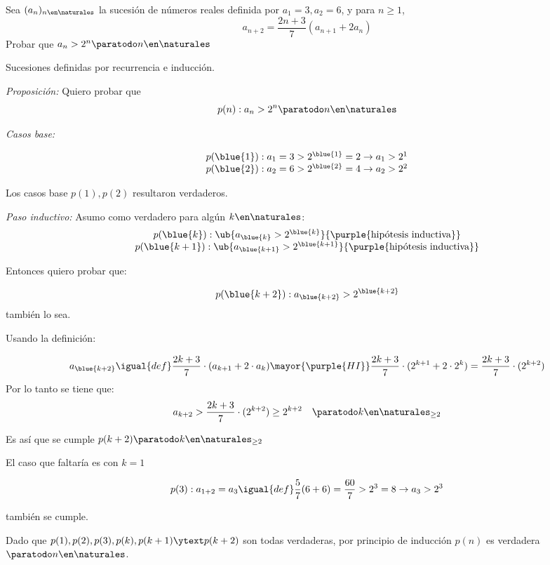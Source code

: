 \begin{enunciado}{\ejExtra}
  Sea $(a_n)_{n\en\naturales}$ la sucesión de números reales definida por $a_1 = 3, a_2 = 6$, y para $n \geq 1$,
  $$
    a_{n+2} = \frac{2n + 3}{7} (a_{n+1} + 2a_n)
  $$
  Probar que $a_n > 2^n \paratodo n \en \naturales$
\end{enunciado}

Sucesiones definidas por recurrencia e inducción.

\textit{Proposición:}
Quiero probar que
$$
  p(n) : a_n > 2^n \paratodo n \en \naturales
$$

\textit{Casos base:}

$$
  \begin{array}{l}
    p(\blue{1}) : a_1 = 3 > 2^{\blue{1}} = 2 \to a_1 > 2^1 \\
    p(\blue{2}) : a_2 = 6 > 2^{\blue{2}} = 4 \to a_2 > 2^2 \\
  \end{array}
$$

Los casos base $p(1), p(2)$ resultaron verdaderos. \bigskip

\textit{Paso inductivo:}
Asumo como verdadero para algún $k \en \naturales$:
$$
  \begin{array}{c}
    p(\blue{k}) : \ub{ a_{\blue{k}} > 2^{\blue{k}} }{\purple{\text{hipótesis inductiva}}} \\
    p(\blue{k+1}) : \ub{a_{\blue{k+1}} > 2^{\blue{k+1}}}{\purple{\text{hipótesis inductiva}}}
  \end{array}
$$

Entonces quiero probar que:

$$
  p(\blue{k+2}) : a_{\blue{k+2}} > 2^{\blue{k+2}}
$$
también lo sea.

Usando la definición:

$$
  a_{\blue{k+2}}
  \igual{def}
  \frac{2k+3}{7} \cdot (a_{k+1} + 2 \cdot a_k)
  \mayor{\purple{HI}}
  \frac{2k+3}{7} \cdot (2^{k+1} + 2 \cdot 2^k)
  =
  \frac{2k+3}{7} \cdot (2^{k+2})
$$
Por lo tanto se tiene que:
$$
  a_{k+2} > \frac{2k+3}{7} \cdot (2^{k+2}) \geq 2^{k+2} \quad \paratodo k \en \naturales_{\geq 2}
$$

Es así que se cumple $p(k+2) \paratodo k \en \naturales_{\geq 2}$

El caso que faltaría es con $k = 1$

$$
  p(3): a_{1 + 2} = a_3 \igual{def} \frac{5}{7} (6 + 6) = \frac{60}{7}  > 2^3 = 8 \to a_3 > 2^3
$$

también se cumple.

Dado que $p(1), p(2), p(3), p(k), p(k+1) \ytext p(k+2)$ son todas verdaderas, por principio de inducción $p(n)$ es verdadera $\paratodo n \en \naturales$.

\begin{aportes}
  \item {}
\end{aportes}
